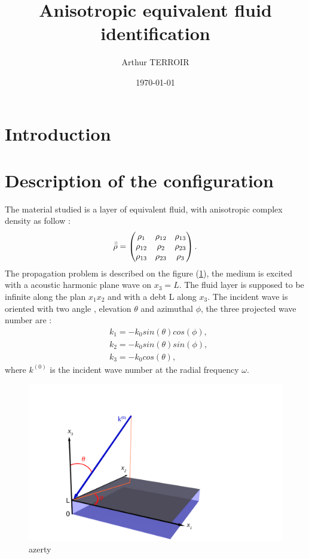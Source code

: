 \documentclass{article}
\title{Anisotropic equivalent fluid identification}
\author{Arthur TERROIR}
\date{\today}
\begin{document}
\maketitle

\section{Introduction}


\section{Description of the configuration}
    The material studied is a layer of equivalent fluid, with anisotropic complex density as follow : 
    \begin{align}
        \Bar{\Bar{\rho}}=\begin{pmatrix}
    					\rho_{1} & \rho_{12} & \rho_{13} \\
                        \rho_{12} & \rho_{2} & \rho_{23} \\
                        \rho_{13} & \rho_{23} & \rho_{3}\end{pmatrix}\label{Density_tensor}.
    \end{align}
    The propagation problem is described on the figure (\ref{Schema_PB}), the medium is excited with a acoustic harmonic plane wave on $x_3=L$. The fluid layer is supposed to be infinite along the plan $x_1x_2$ and with a debt L along $x_3$. The incident wave is oriented with two angle , elevation $\theta$ and azimuthal $\phi$, the three projected wave number are :   
   \begin{align}
    &k_1=-k_0 sin(\theta) cos(\phi),\label{k1} \\
    &k_2=-k_0 sin(\theta) sin(\phi),\label{k2} \\
    &k_3= -k_0 cos(\theta),\label{k3}
    \end{align}
    where $k^{(0)}$ is the incident wave number at the radial frequency $\omega$. 
    
    \begin{figure}[ht!]
        \centering
        \includegraphics[scale=0.6]{Fig3D.png}
        \caption{azerty}
        \label{Schema_PB}
    \end{figure}
    
\end{document}

